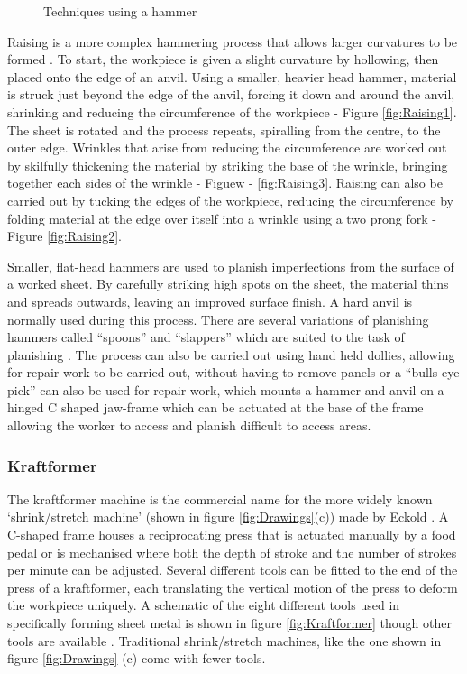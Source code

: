 \begin{figure}[]
%
\caption{Techniques using a hammer}
\label{fig:hammertech}
\end{figure}


Raising is a more complex hammering process that allows larger curvatures to be formed \citep{Livesey2019TheBodies}. To start, the workpiece is given a slight curvature by hollowing, then placed onto the edge of an anvil. Using a smaller, heavier head hammer, material is struck just beyond the edge of the anvil, forcing it down and around the anvil, shrinking and reducing the circumference of the workpiece - Figure \ref{fig:Raising1}. The sheet is rotated and the process repeats, spiralling from the centre, to the outer edge. Wrinkles that arise from reducing the circumference are worked out by skilfully thickening the material by striking the base of the wrinkle, bringing together each sides of the wrinkle - Figuew - \ref{fig:Raising3}.  Raising can also be carried out by tucking the edges of the workpiece, reducing the circumference by folding material at the edge over itself into a wrinkle using a two prong fork - Figure \ref{fig:Raising2}. 

Smaller, flat-head hammers are used to planish imperfections from the surface of a worked sheet. By carefully striking high spots on the sheet, the material thins and spreads outwards, leaving an improved surface finish. A hard anvil is normally used during this process. There are several variations of planishing hammers called ``spoons'' and ``slappers'' which are suited to the task of planishing \citep{Barr2013ProfessionalFabrication}. The process can also be carried out using hand held dollies, allowing for repair work to be carried out, without having to remove panels or a ``bulls-eye pick'' can also be used for repair work, which mounts a hammer and anvil on a hinged C shaped jaw-frame which can be actuated at the base of the frame allowing the worker to access and planish difficult to access areas.


\subsubsection*{Kraftformer} \label{sec:Kraftformer}

The kraftformer machine is the commercial name for the more widely known `shrink/stretch machine' (shown in figure \ref{fig:Drawings}(c)) made by Eckold \citep{Unknown2020ECKOLDBrochure}. A C-shaped frame houses a reciprocating press that is actuated manually by a food pedal or is mechanised where both the depth of stroke and the number of strokes per minute can be adjusted. Several different tools can be fitted to the end of the press of a kraftformer, each translating the vertical motion of the press to deform the workpiece uniquely. A schematic of the eight different tools used in specifically forming sheet metal is shown in figure \ref{fig:Kraftformer} though other tools are available \citep{Unknown2020ECKOLDBrochure}. Traditional shrink/stretch machines, like the one shown in figure \ref{fig:Drawings} (c) come with fewer tools.

